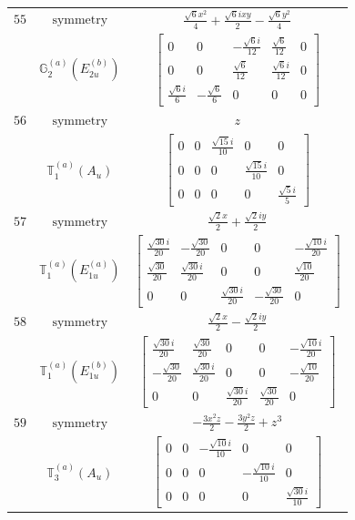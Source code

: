 \documentclass[fleqn,8pt,landscape]{jsarticle}
\begin{document}
\begin{longtable}{ccc}
$ 55 $ & $ \text{symmetry} $ & $ \frac{\sqrt{6} x^{2}}{4} + \frac{\sqrt{6} i x y}{2} - \frac{\sqrt{6} y^{2}}{4} $ \\
$  $ & $ \mathbb{G}_{2}^{(a)}(E_{2u}^{(b)}) $ & $ \begin{bmatrix} 0 & 0 & - \frac{\sqrt{6} i}{12} & \frac{\sqrt{6}}{12} & 0 \\ 0 & 0 & \frac{\sqrt{6}}{12} & \frac{\sqrt{6} i}{12} & 0 \\ \frac{\sqrt{6} i}{6} & - \frac{\sqrt{6}}{6} & 0 & 0 & 0 \end{bmatrix} $ \\ \hline
$ 56 $ & $ \text{symmetry} $ & $ z $ \\
$  $ & $ \mathbb{T}_{1}^{(a)}(A_{u}) $ & $ \begin{bmatrix} 0 & 0 & \frac{\sqrt{15} i}{10} & 0 & 0 \\ 0 & 0 & 0 & \frac{\sqrt{15} i}{10} & 0 \\ 0 & 0 & 0 & 0 & \frac{\sqrt{5} i}{5} \end{bmatrix} $ \\ \hline
$ 57 $ & $ \text{symmetry} $ & $ \frac{\sqrt{2} x}{2} + \frac{\sqrt{2} i y}{2} $ \\
$  $ & $ \mathbb{T}_{1}^{(a)}(E_{1u}^{(a)}) $ & $ \begin{bmatrix} \frac{\sqrt{30} i}{20} & - \frac{\sqrt{30}}{20} & 0 & 0 & - \frac{\sqrt{10} i}{20} \\ \frac{\sqrt{30}}{20} & \frac{\sqrt{30} i}{20} & 0 & 0 & \frac{\sqrt{10}}{20} \\ 0 & 0 & \frac{\sqrt{30} i}{20} & - \frac{\sqrt{30}}{20} & 0 \end{bmatrix} $ \\ \hline
$ 58 $ & $ \text{symmetry} $ & $ \frac{\sqrt{2} x}{2} - \frac{\sqrt{2} i y}{2} $ \\
$  $ & $ \mathbb{T}_{1}^{(a)}(E_{1u}^{(b)}) $ & $ \begin{bmatrix} \frac{\sqrt{30} i}{20} & \frac{\sqrt{30}}{20} & 0 & 0 & - \frac{\sqrt{10} i}{20} \\ - \frac{\sqrt{30}}{20} & \frac{\sqrt{30} i}{20} & 0 & 0 & - \frac{\sqrt{10}}{20} \\ 0 & 0 & \frac{\sqrt{30} i}{20} & \frac{\sqrt{30}}{20} & 0 \end{bmatrix} $ \\ \hline
$ 59 $ & $ \text{symmetry} $ & $ - \frac{3 x^{2} z}{2} - \frac{3 y^{2} z}{2} + z^{3} $ \\
$  $ & $ \mathbb{T}_{3}^{(a)}(A_{u}) $ & $ \begin{bmatrix} 0 & 0 & - \frac{\sqrt{10} i}{10} & 0 & 0 \\ 0 & 0 & 0 & - \frac{\sqrt{10} i}{10} & 0 \\ 0 & 0 & 0 & 0 & \frac{\sqrt{30} i}{10} \end{bmatrix} $ \\ \hline

\end{longtable}
\end{document}
